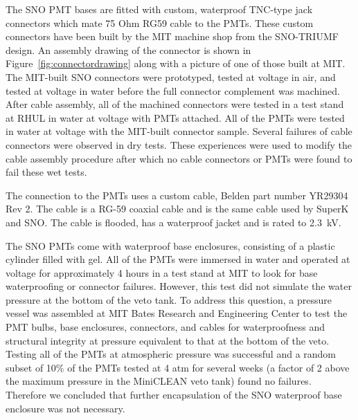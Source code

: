 \documentclass[review,number,sort&compress]{elsarticle}
\begin{document}
The SNO PMT bases are fitted with custom, waterproof TNC-type jack
connectors which mate 75 Ohm RG59 cable to the PMTs. These custom
connectors have been built by the MIT machine shop from the SNO-TRIUMF
design. An assembly drawing of the connector is shown in
Figure~\ref{fig:connectordrawing} along with a picture of one of those
built at MIT. The MIT-built SNO
connectors were prototyped, tested at voltage in air, and tested at
voltage in water before the full connector complement was machined.
After cable assembly, all of the machined connectors were tested in
a test stand at RHUL in water at voltage with PMTs attached. All of the
PMTs were tested in water at voltage with the MIT-built connector
sample. Several failures of cable connectors were observed in dry
tests. These experiences were used to modify the cable assembly
procedure after which no cable connectors or PMTs were found to fail
these wet tests.


The connection to the PMTs uses a custom cable, Belden part number YR29304 Rev 2. The cable is a
RG-59 coaxial cable and is the same cable used by SuperK and SNO.
The cable is flooded, has a waterproof jacket and is rated to 2.3~kV.

The SNO PMTs come with waterproof base enclosures, consisting of a
plastic cylinder filled with gel. All of the PMTs were immersed in water and operated at voltage for approximately 4 hours in a test stand at
MIT to look for base waterproofing or connector failures. However,
this test did not simulate the water pressure at the bottom of the
veto tank. To address this question, a pressure vessel was assembled
at MIT Bates Research and Engineering Center to test the PMT bulbs, base enclosures, connectors, and
cables for waterproofness and structural integrity at pressure
equivalent to that at the bottom of the veto. Testing
all of the PMTs at atmospheric pressure was successful and a random
subset of 10\% of the PMTs tested at 4 atm for several weeks (a factor of 2
above the maximum pressure in the MiniCLEAN veto tank) found no
failures. Therefore we concluded that further encapsulation of the
SNO waterproof base enclosure was not necessary.
\end{document}
